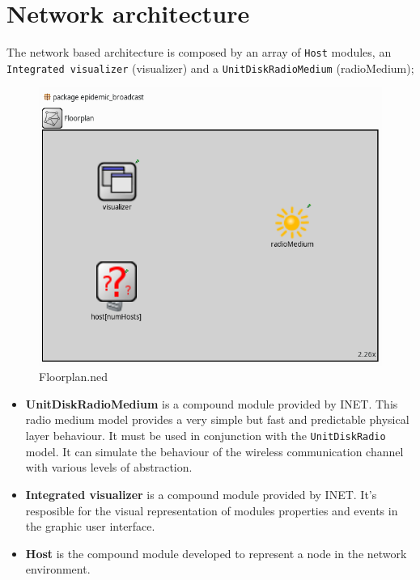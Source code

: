 \section{Network architecture}
The network based architecture is composed by an array of \texttt{Host} modules, an
\texttt{Integrated visualizer} (visualizer) and a \texttt{UnitDiskRadioMedium} (radioMedium);
\begin{figure}[H]
    \begin{center}
        \includegraphics[scale=0.35]{img/floorplan.png}
        \caption{Floorplan.ned}
        \label{fig:single_queue}
    \end{center}
    \vspace*{-0.8cm}
\end{figure}
\begin{itemize}
    \item \textbf{UnitDiskRadioMedium} is a compound module provided by INET.
    This radio medium model provides a very simple but fast and predictable
    physical layer behaviour. It must be used in conjunction with the
    \texttt{UnitDiskRadio} model. It can simulate the behaviour of the wireless
    communication channel with various levels of abstraction.
    \item \textbf{Integrated visualizer} is a compound module provided by INET.
    It's resposible for the visual representation of modules properties and
    events in the graphic user interface.
    \item \textbf{Host} is the compound module developed to represent a node
    in the network environment.
\end{itemize}
